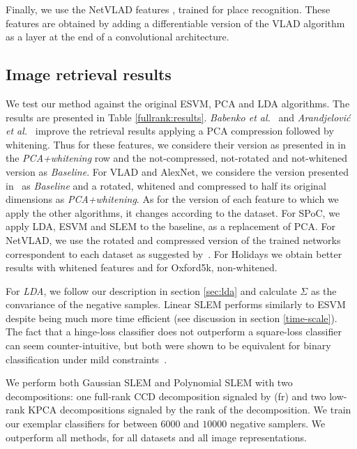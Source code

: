 Finally, we use the NetVLAD features \cite{Arandjelovic15}, trained for place recognition. These features are obtained by adding a differentiable version of the VLAD algorithm~\cite{Delhumeau2013} as a layer at the end of a convolutional architecture.


\subsection{Image retrieval results}

We test our method against the original ESVM, PCA and LDA algorithms. The results are presented in Table \ref{fullrank:results}.
\textit{Babenko et al.}~\cite{babenko15} and \textit{Arandjelovi\'c et al.}~\cite{Arandjelovic15} improve the retrieval results applying a PCA compression followed by whitening. 
Thus for these features, we considere their version as presented in \cite{Arandjelovic15,babenko15} in the \textit{PCA+whitening} row and the not-compressed, not-rotated and not-whitened version as \textit{Baseline}. 
For VLAD and AlexNet, we considere the version presented in~\cite{ZePe15} as \textit{Baseline} and a rotated, whitened and compressed to half its original dimensions as \textit{PCA+whitening}. 
As for the version of each feature to which we apply the other algorithms, it changes according to the dataset. 
For SPoC, we apply LDA, ESVM and SLEM to the baseline, as a replacement of PCA. 
For NetVLAD, we use the rotated and compressed version of the trained networks correspondent to each dataset as suggested by~\cite{Arandjelovic15}. 
For Holidays we obtain better results with whitened features and for Oxford5k, non-whitened.

For \textit{LDA}, we follow our description in section \ref{sec:lda} and calculate $\Sigma$ as the convariance of the negative samples.
Linear SLEM performs similarly to ESVM despite being much more time efficient (see discussion in section \ref{time-scale}). 
The fact that a hinge-loss classifier does not outperform a square-loss classifier can seem counter-intuitive, but both were shown to be equivalent for binary classification under mild constraints~\cite{YeXi07}.

We perform both Gaussian SLEM and Polynomial SLEM with two decompositions: one full-rank CCD decomposition signaled by (fr) and two low-rank KPCA decompositions signaled by the rank of the decomposition. 
We train our exemplar classifiers for between $6000$ and $10000$ negative samplers. We outperform all methods, for all datasets and all image representations. 



